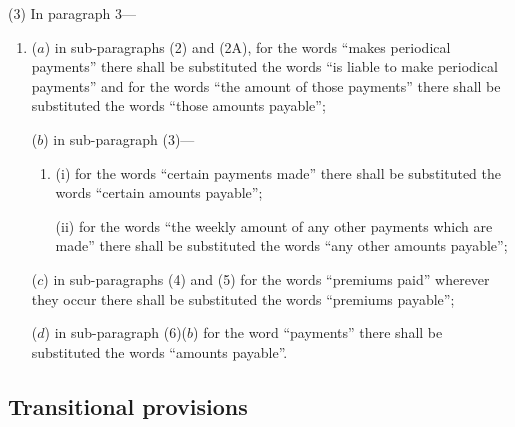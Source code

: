 \documentclass[12pt,a4paper]{article}
\begin{document}
(3) In paragraph 3—
\begin{enumerate}\item[]
($a$) in sub-paragraphs (2) and (2A), for the words “makes periodical payments” there shall be substituted the words “is liable to make periodical payments” and for the words “the amount of those payments” there shall be substituted the words “those amounts payable”;

($b$) in sub-paragraph (3)—
\begin{enumerate}\item[]
(i) for the words “certain payments made” there shall be substituted the words “certain amounts payable”;

(ii) for the words “the weekly amount of any other payments which are made” there shall be substituted the words “any other amounts payable”;
\end{enumerate}

($c$) in sub-paragraphs (4) and (5) for the words “premiums paid” wherever they occur there shall be substituted the words “premiums payable”;

($d$) in sub-paragraph (6)($b$) for the word “payments” there shall be substituted the words “amounts payable”.
\end{enumerate}

\subsection[59. Transitional provisions]{Transitional provisions}

%
\end{document}
